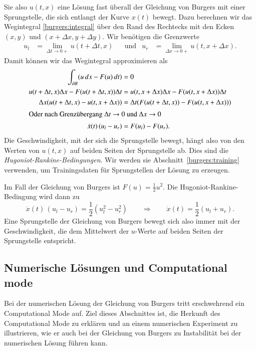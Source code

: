 Sie also $u(t,x)$ eine Lösung fast überall der Gleichung von Burgers mit
einer Sprungstelle, die sich entlangt der Kurve $x(t)$ bewegt.
Dazu berechnen wir das Wegintegral \eqref{burgers:integral} über den Rand
des Rechtecks mit den Ecken $(x,y)$ und $(x+\Delta x, y+\Delta y)$.
Wir benötigen die Grenzwerte
\[
\begin{aligned}
u_l &= \lim_{\Delta t\to 0+} u(t+\Delta t,x)
&&\text{und}&
u_r &= \lim_{\Delta x\to 0+} u(t,x+\Delta x).
\end{aligned}
\]
Damit können wir das Wegintegral approximieren als
\begin{align}
\int_{\partial R}(u\,dx -F(u)\,dt)
&=
0
\notag
\\
u(t+\Delta t,x)
\Delta x
-
F(u(t+\Delta t,x))
\Delta t
&=
u(t,x+\Delta x) \Delta x
-
F(u(t,x+\Delta x)) \Delta t
\notag
\\
\Delta x
(
u(t+\Delta t,x)
-
u(t,x+\Delta x)
)
&=
\Delta t
(F(u(t+\Delta t,x))
-
F(u(t,x+\Delta x))
)
\notag
\\
\intertext{Oder nach Grenzübergang $\Delta t\to 0$ und $\Delta x\to 0$}
\dot x(t)\, (u_l-u_r) &= F(u_l) - F(u_r).
\label{burgers:hugoniot-rankine}
\end{align}
Die Geschwindigkeit, mit der sich die Sprungstelle bewegt, hängt also 
von den Werten von $u(t,x)$ auf beiden Seiten der Sprungstelle ab.
Dies sind die {\em Hugoniot-Rankine-Bedingungen}.
Wir werden sie Abschnitt~\ref{burgers:training} verwenden, um Trainingsdaten
für Sprungstellen der Lösung zu erzeugen.

Im Fall der Gleichung von Burgers ist $F(u)=\frac12u^2$.
Die Hugoniot-Rankine-Bedingung wird dann zu
\begin{equation}
\dot x(t)\, (u_l-u_r) = \frac12 (u_l^2-u_r^2)
\qquad\Rightarrow\qquad
\dot x(t)
=
\frac12 (u_l+u_r).
\end{equation}
Eine Sprungstelle der Gleichung von Burgers bewegt sich also immer
mit der Geschwindigkeit, die dem Mittelwert der $u$-Werte auf
beiden Seiten der Sprungstelle entspricht.

\subsection{Numerische Lösungen und Computational mode}
Bei der numerischen Lösung der Gleichung von Burgers tritt erschwehrend ein
Computational Mode auf.
Ziel dieses Abschnittes ist, die Herkunft des Computational Mode zu erklären
und an einem numerischen Experiment zu illustrieren, wie er auch bei
der Gleichung von Burgers zu Instabilität bei der numerischen
Lösung führen kann.

